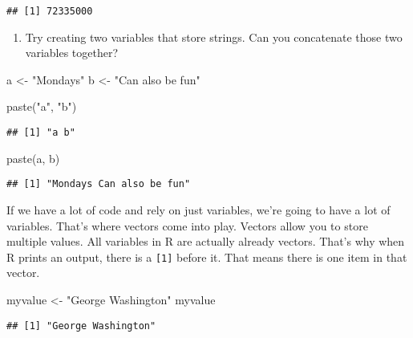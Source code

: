 \documentclass[
]{article}
\newenvironment{Shaded}{\begin{snugshade}}{\end{snugshade}}
\newcommand{\FunctionTok}[1]{\textcolor[rgb]{0.00,0.00,0.00}{#1}}
\newcommand{\NormalTok}[1]{#1}
\newcommand{\OtherTok}[1]{\textcolor[rgb]{0.56,0.35,0.01}{#1}}
\newcommand{\StringTok}[1]{\textcolor[rgb]{0.31,0.60,0.02}{#1}}
\providecommand{\tightlist}{%
  \setlength{\itemsep}{0pt}\setlength{\parskip}{0pt}}
\begin{document}
\begin{verbatim}
## [1] 72335000
\end{verbatim}

\begin{enumerate}
\def\labelenumi{(\arabic{enumi})}
\setcounter{enumi}{13}
\tightlist
\item
  Try creating two variables that store strings. Can you concatenate
  those two variables together?
\end{enumerate}

\begin{Shaded}
\begin{Highlighting}[]
\NormalTok{a }\OtherTok{\textless{}{-}} \StringTok{"Mondays"}
\NormalTok{b }\OtherTok{\textless{}{-}} \StringTok{"Can also be fun"}

\FunctionTok{paste}\NormalTok{(}\StringTok{"a"}\NormalTok{, }\StringTok{"b"}\NormalTok{)}
\end{Highlighting}
\end{Shaded}

\begin{verbatim}
## [1] "a b"
\end{verbatim}

\begin{Shaded}
\begin{Highlighting}[]
\FunctionTok{paste}\NormalTok{(a, b)}
\end{Highlighting}
\end{Shaded}

\begin{verbatim}
## [1] "Mondays Can also be fun"
\end{verbatim}

If we have a lot of code and rely on just variables, we're going to have
a lot of variables. That's where vectors come into play. Vectors allow
you to store multiple values. All variables in R are actually already
vectors. That's why when R prints an output, there is a \texttt{{[}1{]}}
before it. That means there is one item in that vector.

\begin{Shaded}
\begin{Highlighting}[]
\NormalTok{myvalue }\OtherTok{\textless{}{-}} \StringTok{"George Washington"}
\NormalTok{myvalue}
\end{Highlighting}
\end{Shaded}

\begin{verbatim}
## [1] "George Washington"
\end{verbatim}
\end{document}
